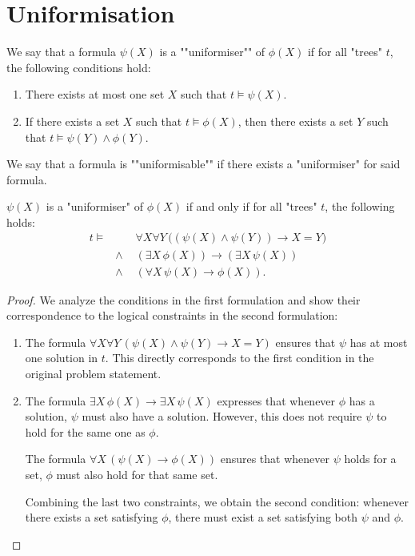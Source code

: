 \documentclass{article}
\begin{document}
\section{Uniformisation}

\begin{definition}[Uniformiser]
	We say that a formula $\psi(X)$ is a ""uniformiser"" of $\phi(X)$ if for all "trees" $t$, the following conditions hold:
	\begin{enumerate}
		\item There exists at most one set $X$ such that $t \models \psi(X)$.
		\item If there exists a set $X$ such that $t \models \phi(X)$, then there exists a set $Y$ such that $t \models \psi(Y) \land \phi(Y)$.
	\end{enumerate}

	We say that a formula is ""uniformisable"" if there exists a "uniformiser" for said formula.
\end{definition}

\begin{lemma}
	$\psi(X)$ is a "uniformiser" of $\phi(X)$ if and only if for all "trees" $t$, the following holds:
	\begin{eqnarray*}
		t \models &\quad &  \forall X \forall Y \, \Big((\psi(X) \land \psi(Y)) \rightarrow X = Y\Big) \\
		& \land & (\exists X \, \phi(X)) \rightarrow (\exists X \, \psi(X)) \\
		& \land& (\forall X \, \psi(X) \rightarrow \phi(X)).
	\end{eqnarray*}
\end{lemma}

\begin{proof}
	We analyze the conditions in the first formulation and show their correspondence to the logical constraints in the second formulation:

	\begin{enumerate}
		\item The formula $\forall X \forall Y \, (\psi(X) \land \psi(Y) \rightarrow X = Y)$ ensures that $\psi$ has at most one solution
		      in $t$. This directly corresponds to the first condition in the original problem statement.

		\item The formula $\exists X \, \phi(X) \rightarrow \exists X \, \psi(X)$ expresses that whenever $\phi$ has a solution, $\psi$ must also have a solution.
		      However, this does not require $\psi$ to hold for the same one as $\phi$.

		      The formula $\forall X \, (\psi(X) \rightarrow \phi(X))$ ensures that whenever $\psi$ holds for a set, $\phi$ must also hold for that same set.

		      Combining the last two constraints, we obtain the second condition: whenever there exists a set satisfying $\phi$, there must exist a set
		      satisfying both $\psi$ and $\phi$.
	\end{enumerate}
\end{proof}
\end{document}
